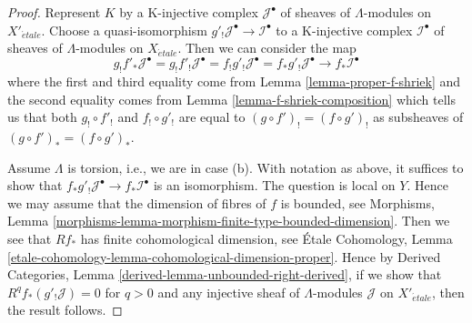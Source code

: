 \documentclass{stacks-project}
\theoremstyle{plain}
\theoremstyle{definition}
\theoremstyle{remark}
\numberwithin{equation}{subsection}
\def\etale{{\acute{e}tale}}
\begin{document}
\begin{proof}
Represent $K$ by a K-injective complex $\mathcal{J}^\bullet$ of
sheaves of $\Lambda$-modules on $X'_\etale$. Choose a quasi-isomorphism
$g'_!\mathcal{J}^\bullet \to \mathcal{I}^\bullet$ to a
K-injective complex $\mathcal{I}^\bullet$ of
sheaves of $\Lambda$-modules on $X_\etale$.
Then we can consider the map
$$
g_!f'_*\mathcal{J}^\bullet =
g_!f'_!\mathcal{J}^\bullet =
f_!g'_!\mathcal{J}^\bullet =
f_*g'_!\mathcal{J}^\bullet \to
f_*\mathcal{I}^\bullet
$$
where the first and third equality come from
Lemma \ref{lemma-proper-f-shriek}
and the second equality comes from
Lemma \ref{lemma-f-shriek-composition} which tells us that both
$g_! \circ f'_!$ and $f_! \circ g'_!$ are equal to
$(g \circ f')_! = (f \circ g')_!$ as subsheaves of
$(g \circ f')_* = (f \circ g')_*$.

\medskip\noindent
Assume $\Lambda$ is torsion, i.e., we are in case (b).
With notation as above, it suffices to show that
$f_*g'_!\mathcal{J}^\bullet \to f_*\mathcal{I}^\bullet$
is an isomorphism. The question is local on $Y$.
Hence we may assume that the dimension
of fibres of $f$ is bounded, see Morphisms, Lemma
\ref{morphisms-lemma-morphism-finite-type-bounded-dimension}.
Then we see that $Rf_*$ has finite cohomological dimension, see
\'Etale Cohomology, Lemma
\ref{etale-cohomology-lemma-cohomological-dimension-proper}.
Hence by Derived Categories, Lemma \ref{derived-lemma-unbounded-right-derived},
if we show that $R^qf_*(g'_!\mathcal{J}) = 0$ for $q > 0$
and any injective sheaf of $\Lambda$-modules $\mathcal{J}$
on $X'_\etale$, then the result follows.


\end{proof}
\end{document}
